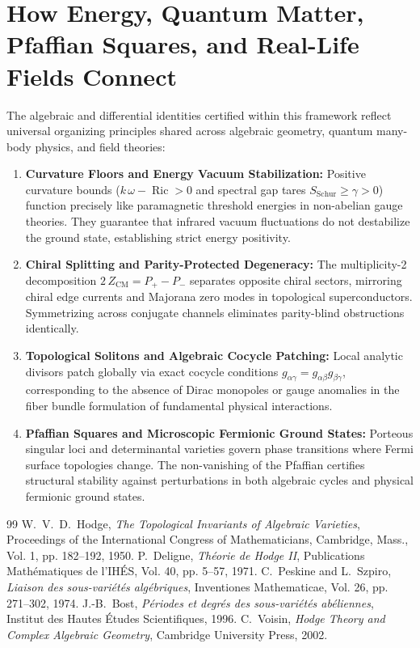 \documentclass[11pt,a4paper]{article}
\theoremstyle{definition}
\begin{document}
\section{How Energy, Quantum Matter, Pfaffian Squares, and Real-Life Fields Connect}

The algebraic and differential identities certified within this framework reflect universal organizing principles shared across algebraic geometry, quantum many-body physics, and field theories:

\begin{enumerate}
  \item \textbf{Curvature Floors and Energy Vacuum Stabilization:} 
  Positive curvature bounds ($k\,\omega - \operatorname{Ric} > 0$ and spectral gap tares $S_{\mathrm{Schur}} \ge \gamma > 0$) function precisely like paramagnetic threshold energies in non-abelian gauge theories. They guarantee that infrared vacuum fluctuations do not destabilize the ground state, establishing strict energy positivity.
  
  \item \textbf{Chiral Splitting and Parity-Protected Degeneracy:} 
  The multiplicity-2 decomposition $2\,Z_{\mathrm{CM}} = P_+ - P_-$ separates opposite chiral sectors, mirroring chiral edge currents and Majorana zero modes in topological superconductors. Symmetrizing across conjugate channels eliminates parity-blind obstructions identically.
  
  \item \textbf{Topological Solitons and Algebraic Cocycle Patching:} 
  Local analytic divisors patch globally via exact cocycle conditions $g_{\alpha\gamma} = g_{\alpha\beta} g_{\beta\gamma}$, corresponding to the absence of Dirac monopoles or gauge anomalies in the fiber bundle formulation of fundamental physical interactions.
  
  \item \textbf{Pfaffian Squares and Microscopic Fermionic Ground States:} 
  Porteous singular loci and determinantal varieties govern phase transitions where Fermi surface topologies change. The non-vanishing of the Pfaffian certifies structural stability against perturbations in both algebraic cycles and physical fermionic ground states.
\end{enumerate}

\begin{thebibliography}{99}
 W.~V.~D.~Hodge, \emph{The Topological Invariants of Algebraic Varieties}, Proceedings of the International Congress of Mathematicians, Cambridge, Mass., Vol. 1, pp. 182--192, 1950.
 P.~Deligne, \emph{Th\'eorie de Hodge II}, Publications Math\'ematiques de l'IH\'ES, Vol. 40, pp. 5--57, 1971.
 C.~Peskine and L.~Szpiro, \emph{Liaison des sous-vari\'et\'es alg\'ebriques}, Inventiones Mathematicae, Vol. 26, pp. 271--302, 1974.
 J.-B.~Bost, \emph{P\'eriodes et degr\'es des sous-vari\'et\'es ab\'eliennes}, Institut des Hautes \'Etudes Scientifiques, 1996.
 C.~Voisin, \emph{Hodge Theory and Complex Algebraic Geometry}, Cambridge University Press, 2002.
\end{thebibliography}
\end{document}
